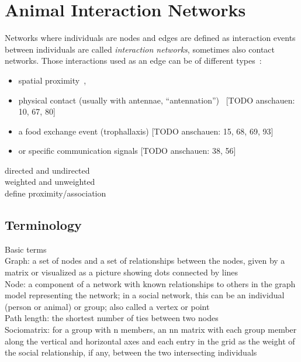\section{Animal Interaction Networks}

Networks where individuals are nodes and edges are defined as interaction events between individuals are called \emph{interaction networks}, sometimes also contact networks. 
Those interactions used as an edge can be of different types~\cite{charbonneau2013social}:

\begin{itemize}
\item spatial proximity~\cite{jeanson2012long, otterstatter2007contact},
\item physical contact (usually with antennae, “antennation”)~\cite{mersch2013tracking} [TODO anschauen: 10, 67, 80]
\item a food exchange event (trophallaxis) [TODO anschauen: 15, 68, 69, 93]
\item or specific communication signals [TODO anschauen: 38, 56]
\end{itemize}

directed and undirected\\
weighted and unweighted\\

define proximity/association\\

\subsection{Terminology}
Basic terms\\

Graph: a set of nodes and a set of relationships between the
nodes, given by a matrix or visualized as a picture showing
dots connected by lines\\

Node: a component of a network with known relationships
to others in the graph model representing the network; in
a social network, this can be an individual (person or animal)
or group; also called a vertex or point\\

Path length: the shortest number of ties between two nodes\\

Sociomatrix: for a group with n members, an nn matrix
with each group member along the vertical and horizontal
axes and each entry in the grid as the weight of the social relationship,
if any, between the two intersecting individuals\\

